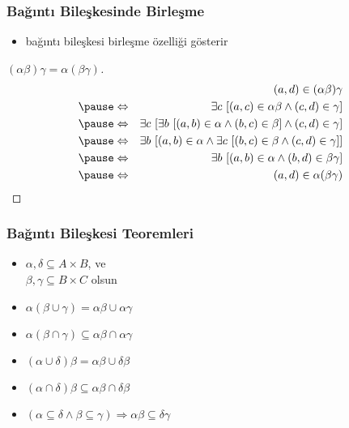 \documentclass[dvipsnames]{beamer}
\theoremstyle{definition}
\theoremstyle{example}
\theoremstyle{plain}
\begin{document}
\begin{frame}
  \frametitle{Bağıntı Bileşkesinde Birleşme}

  \begin{itemize}
    \item bağıntı bileşkesi birleşme özelliği gösterir
  \end{itemize}

  \pause
  \begin{proof}[$(\alpha \beta) \gamma = \alpha (\beta \gamma)$]
    \begin{eqnarray*}
      &                 & (a,d) \in (\alpha \beta)\gamma\\\pause
      & \Leftrightarrow & \exists c~[(a,c) \in \alpha \beta
                              \wedge (c,d) \in \gamma]\\\pause
      & \Leftrightarrow & \exists c~[\exists b~[(a,b) \in \alpha
                                         \wedge (b,c) \in \beta]
                                         \wedge (c,d) \in \gamma]\\\pause
      & \Leftrightarrow & \exists b~[(a,b) \in \alpha
                              \wedge \exists c~[(b,c) \in \beta
                              \wedge (c,d) \in \gamma]]\\\pause
      & \Leftrightarrow & \exists b~[(a,b) \in \alpha
                              \wedge (b,d) \in \beta \gamma]\\\pause
      & \Leftrightarrow & (a,d) \in \alpha (\beta \gamma)
    \end{eqnarray*}
  \end{proof}
\end{frame}

\begin{frame}
  \frametitle{Bağıntı Bileşkesi Teoremleri}

  \begin{itemize}
    \item $\alpha , \delta \subseteq A \times B$, ve\\
           $\beta , \gamma \subseteq B \times C$ olsun

    \medskip
    \item $\alpha (\beta \cup \gamma) = \alpha \beta \cup \alpha \gamma$

    \item $\alpha (\beta \cap \gamma)
      \subseteq \alpha \beta \cap \alpha \gamma$

    \item $(\alpha \cup \delta) \beta = \alpha \beta \cup \delta \beta$

    \item $(\alpha \cap \delta) \beta
      \subseteq \alpha \beta \cap \delta \beta$

    \item $(\alpha \subseteq \delta \wedge \beta \subseteq \gamma)
      \Rightarrow \alpha \beta \subseteq \delta \gamma$
  \end{itemize}
\end{frame}
\end{document}
